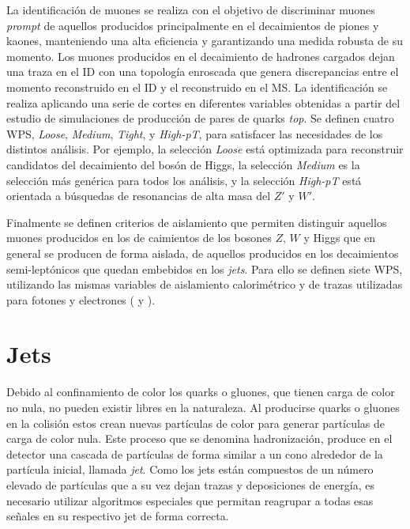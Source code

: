 La identificación de muones se realiza con el objetivo de discriminar muones \textit{prompt} de aquellos producidos principalmente en el decaimientos de piones y kaones, manteniendo una alta eficiencia y garantizando una medida robusta de su momento. Los muones producidos en el decaimiento de hadrones cargados dejan una traza en el ID con una topología enroscada  que genera discrepancias entre el momento reconstruido en el ID y el reconstruido en el MS. La identificación se realiza aplicando una serie de cortes en diferentes variables \cite{PERF-2015-10} obtenidas a partir del estudio de simulaciones de producción de pares de quarks \textit{top}. Se definen cuatro WPS, \textit{Loose}, \textit{Medium}, \textit{Tight}, y \textit{High-pT}, para satisfacer las necesidades de los distintos análisis. Por ejemplo, la selección \textit{Loose} está optimizada para reconstruir candidatos del decaimiento del bosón de Higgs, la selección \textit{Medium} es la selección más genérica para todos los análisis, y la selección \textit{High-pT} está orientada a búsquedas de resonancias de alta masa del $Z'$ y $W'$.

Finalmente se definen criterios de aislamiento que permiten distinguir aquellos muones producidos en los de caimientos de los bosones $Z$, $W$ y Higgs que en general se producen de forma aislada, de aquellos producidos en los decaimientos semi-leptónicos que quedan embebidos en los \textit{jets}. Para ello se definen siete WPS, utilizando las mismas variables de aislamiento calorimétrico y de trazas utilizadas para fotones y electrones ( y ).


\section{Jets}

Debido al confinamiento de color los quarks o gluones, que tienen carga de color no nula, no pueden existir libres en la naturaleza. Al producirse quarks o gluones en la colisión estos crean nuevas partículas de color para generar partículas de carga de color nula. Este proceso que se denomina hadronización, produce en el detector una cascada de partículas de forma similar a un cono alrededor de la partícula inicial, llamada \textit{jet}. Como los jets están compuestos de un número elevado de partículas que a su vez dejan trazas y deposiciones de energía, es necesario utilizar algoritmos especiales que permitan reagrupar a todas esas señales en su respectivo jet de forma correcta.

